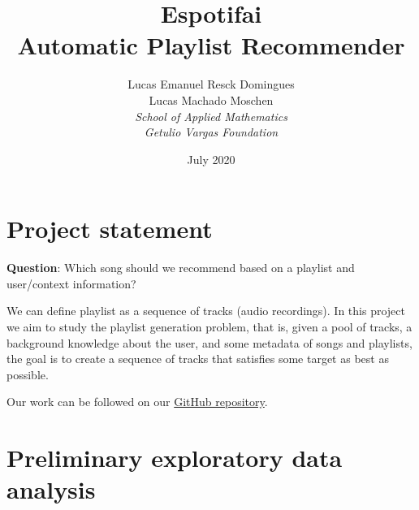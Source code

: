 \documentclass{article}
\title{Espotifai\\
\large Automatic Playlist Recommender}
\author{Lucas Emanuel Resck Domingues\\
Lucas Machado Moschen\\
\textit{School of Applied Mathematics}\\
\textit{Getulio Vargas Foundation}\\}
\date{July 2020}
\begin{document}
\maketitle

\section{Project statement}

    \textbf{Question}: Which song should we recommend based on
    a playlist and user/context information?

    We can define playlist as a sequence of tracks (audio recordings).
    In this project we aim to study the playlist generation problem, that is,
    given a pool of tracks, a background knowledge about the user,
    and some metadata of songs and playlists, the goal is to create a sequence
    of tracks that satisfies some target as best as possible.

    Our work can be followed on our \href{https://github.com/lucasresck/espotifai}{GitHub repository}.

    
\section{Preliminary exploratory data analysis}
\end{document}
